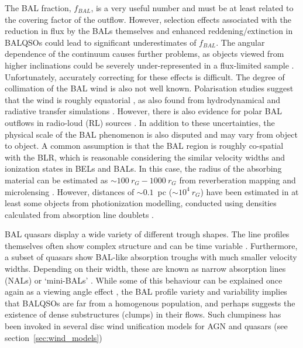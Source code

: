 The BAL fraction, $f_{BAL}$, is a very useful number and must be at least
related to the covering factor of the outflow. However, selection effects associated
with the reduction in flux by the BALs themselves \citep{knigge2008} and enhanced 
reddening/extinction in BALQSOs \citep{reichard2003,allen2011}
could lead to significant underestimates of $f_{BAL}$. 
The angular dependence of the continuum causes further problems,
as objects viewed from higher inclinations could be severely under-represented in 
a flux-limited sample \citep{goodrich1997,krolikvoit1998}.
Unfortunately, accurately correcting for these effects is difficult. 
The degree of collimation of the BAL wind
is also not well known. Polarisation studies suggest that the
wind is roughly equatorial \citep{goodrich1995, cohen1995}, 
as also found from hydrodynamical and radiative transfer simulations 
\citep{PSK2000,PK04, higginbottom2013, borguet2010}.
However, there is also evidence for polar BAL outflows in 
radio-loud (RL) sources \citep{zhou2006,ghoshpunsly2007}.
In addition to these uncertainties, the physical scale of the BAL
phenomenon is also disputed and may vary from object to object.
A common assumption is that the BAL region is roughly co-spatial with
the BLR, which is reasonable considering the similar velocity widths
and ionization states in BELs and BALs. In this case, 
the radius of the absorbing material
can be estimated as $\sim 100~r_G -1000~r_G$ from reverberation mapping
and microlensing \citep[e.g., for BLRs in BALQSOs,][]{sluse2015,odowd2015}.
However, distances of  $\sim0.1$~pc ($\sim 10^4~r_G$) 
have been estimated in at least some objects from photionization modelling, 
conducted using densities calculated from absorption line doublets
\citep{borguet2013,chamberlain2015}.

BAL quasars display a wide variety of different trough shapes. 
The line profiles themselves often show complex structure 
\citep{foltz1987,ganguly2006, simonhamann2010} and can be time variable 
\citep{hall2011, capellupo2011,capellupo2012,capellupo2014, filizak2012}. 
Furthermore, a subset of quasars show
BAL-like absorption troughs with much smaller velocity widths. Depending 
on their width, these are known as narrow absorption lines (NALs) or `mini-BALs'
\citep{misawa2007,misawa2008,nestor2008}.
While some of this behaviour can be explained once again as a viewing angle
effect \citep[e.g. ][]{ganguly2001}, the
BAL profile variety and variability implies that BALQSOs 
are far from a homogenous population, and perhaps suggests the existence of
dense substructures (clumps) in their flows. Such clumpiness has been invoked
in several disc wind unification models for AGN and quasars
(see section~\ref{sec:wind_models})

